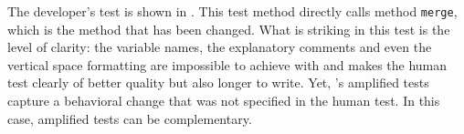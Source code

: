 The developer's test is shown in .
This test method directly calls method \texttt{merge}, which is the method that has been changed. 
What is striking in this test is the level of clarity: the variable names, the explanatory comments and even the vertical space formatting are impossible to achieve with \DCIA and makes the human test clearly of better quality but also longer to write. %
%
Yet, \DCIA's amplified tests capture a behavioral change that was not specified in the human test.
In this case, amplified tests can be complementary.

\begin{figure}[h]
\centering
{}
\end{figure}
